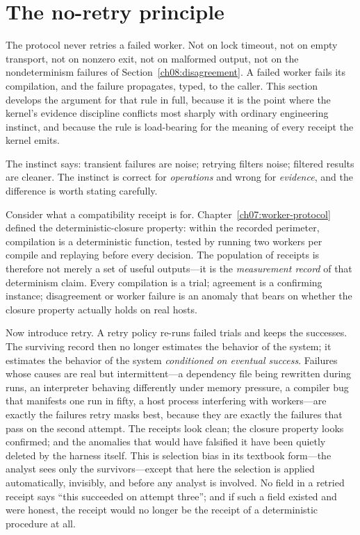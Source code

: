 \section{The no-retry principle}\label{ch08:no-retry}

The protocol never retries a failed worker. Not on lock timeout, not on empty transport, not on nonzero exit, not on malformed output, not on the nondeterminism failures of Section~\ref{ch08:disagreement}. A failed worker fails its compilation, and the failure propagates, typed, to the caller. This section develops the argument for that rule in full, because it is the point where the kernel's evidence discipline conflicts most sharply with ordinary engineering instinct, and because the rule is load-bearing for the meaning of every receipt the kernel emits.

The instinct says: transient failures are noise; retrying filters noise; filtered results are cleaner. The instinct is correct for \emph{operations} and wrong for \emph{evidence}, and the difference is worth stating carefully.

Consider what a compatibility receipt is for. Chapter~\ref{ch07:worker-protocol} defined the deterministic-closure property: within the recorded perimeter, compilation is a deterministic function, tested by running two workers per compile and replaying before every decision. The population of receipts is therefore not merely a set of useful outputs---it is the \emph{measurement record} of that determinism claim. Every compilation is a trial; agreement is a confirming instance; disagreement or worker failure is an anomaly that bears on whether the closure property actually holds on real hosts.

Now introduce retry. A retry policy re-runs failed trials and keeps the successes. The surviving record then no longer estimates the behavior of the system; it estimates the behavior of the system \emph{conditioned on eventual success}. Failures whose causes are real but intermittent---a dependency file being rewritten during runs, an interpreter behaving differently under memory pressure, a compiler bug that manifests one run in fifty, a host process interfering with workers---are exactly the failures retry masks best, because they are exactly the failures that pass on the second attempt. The receipts look clean; the closure property looks confirmed; and the anomalies that would have falsified it have been quietly deleted by the harness itself. This is selection bias in its textbook form---the analyst sees only the survivors---except that here the selection is applied automatically, invisibly, and before any analyst is involved. No field in a retried receipt says ``this succeeded on attempt three''; and if such a field existed and were honest, the receipt would no longer be the receipt of a deterministic procedure at all.

